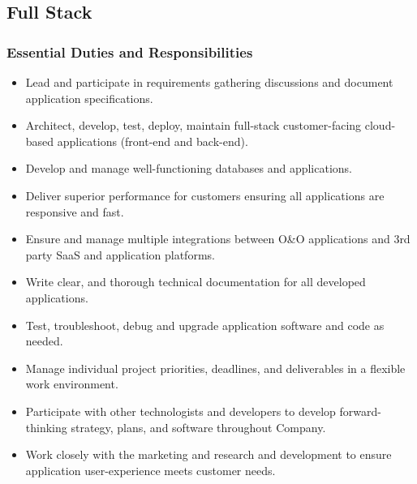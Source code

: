 \subsection*{Full Stack}
\subsubsection*{Essential Duties and Responsibilities}

\begin{itemize}
    \item Lead and participate in requirements gathering discussions and document application specifications.
    \item Architect, develop, test, deploy, maintain full-stack customer-facing cloud-based applications (front-end and back-end).
    \item Develop and manage well-functioning databases and applications.
    \item Deliver superior performance for customers ensuring all applications are responsive and fast.
    \item Ensure and manage multiple integrations between O\&O applications and 3rd party SaaS and application platforms.
    \item Write clear, and thorough technical documentation for all developed applications.
    \item Test, troubleshoot, debug and upgrade application software and code as needed.
    \item Manage individual project priorities, deadlines, and deliverables in a flexible work environment.
    \item Participate with other technologists and developers to develop forward-thinking strategy, plans, and software throughout Company.
    \item Work closely with the marketing and research and development to ensure application user-experience meets customer needs.
\end{itemize}

